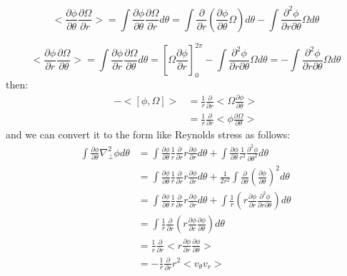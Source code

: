 \documentclass[11pt,a4paper]{article}
\begin{document}
	\begin{equation}
		<\frac{\partial\phi}{\partial\theta}\frac{\partial\Omega}{\partial{r}}>
		=\int\frac{\partial\phi}{\partial\theta}\frac{\partial\Omega}{\partial{r}}d\theta
		=\int\frac{\partial}{\partial{r}}(\frac{\partial\phi}{\partial\theta}\Omega)d\theta-\int\frac{\partial^2\phi}{\partial{r}\partial\theta}\Omega{d\theta}
	\end{equation}
	
	\begin{equation}
		<\frac{\partial\phi}{\partial{r}}\frac{\partial\Omega}{\partial\theta}>
		=\int\frac{\partial\phi}{\partial{r}}\frac{\partial\Omega}{\partial\theta}d\theta
		=[\Omega\frac{\partial\phi}{\partial{r}}]_0^{2\pi}-\int\frac{\partial^2\phi}{\partial{r}\partial\theta}\Omega{d\theta}
		=-\int\frac{\partial^2\phi}{\partial{r}\partial\theta}\Omega{d\theta}
	\end{equation}
	then:
	\begin{equation}
	\begin{aligned}
		-<[\phi,\Omega]>
		&=\frac{1}{r}\frac{\partial}{\partial{r}}<\Omega\frac{\partial\phi}{\partial\theta}>	\\
		&=\frac{1}{r}\frac{\partial}{\partial{r}}<\phi\frac{\partial\Omega}{\partial\theta}>
	\end{aligned}
	\end{equation}
	and we can convert it to the form like Reynolds stress as follows:
	\begin{equation}
	\begin{aligned}
		\int \frac{\partial\phi}{\partial\theta}\nabla_\perp^2\phi{d\theta}
		&=\int \frac{\partial\phi}{\partial\theta}\frac{1}{r}\frac{\partial}{\partial{r}}r\frac{\partial\phi}{\partial{r}}d\theta+\int \frac{\partial\phi}{\partial\theta}\frac{1}{r^2}\frac{\partial^2\phi}{\partial\theta^2}d\theta	\\
		&=\int \frac{\partial\phi}{\partial\theta}\frac{1}{r}\frac{\partial}{\partial{r}}r\frac{\partial\phi}{\partial{r}}d\theta+\frac{1}{2r^2}\int \frac{\partial}{\partial\theta}(\frac{\partial\phi}{\partial\theta})^2d\theta	\\
		&=\int \frac{\partial\phi}{\partial\theta}\frac{1}{r}\frac{\partial}{\partial{r}}r\frac{\partial\phi}{\partial{r}}d\theta+ \int \frac{1}{r}(r\frac{\partial\phi}{\partial{r}}\frac{\partial^2\phi}{\partial{r}\partial\theta})d\theta	\\
		&=\int \frac{1}{r}\frac{\partial}{\partial{r}}(r\frac{\partial\phi}{\partial{r}}\frac{\partial\phi}{\partial\theta})d\theta	\\
		&=\frac{1}{r}\frac{\partial}{\partial{r}}<r\frac{\partial\phi}{\partial{r}}\frac{\partial\phi}{\partial\theta}>	\\
		&=-\frac{1}{r}\frac{\partial}{\partial{r}}r^2<v_\theta{v_r}>
	\end{aligned}
	\end{equation} 
\end{document}
